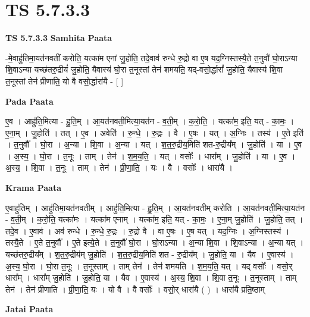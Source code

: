 \documentclass[17pt]{extarticle}
\begin{document}
\section{ TS 5.7.3.3 }

\textbf{TS 5.7.3.3 } \newline
\textbf{Samhita Paata} \newline

-मे॒वाहु॑तिमा॒यत॑नवतीं करोति॒ यत्का॑म एनां जु॒होति॒ तदे॒वाव॑ रुन्धे रु॒द्रो वा ए॒ष यद॒ग्निस्तस्यै॒ते त॒नुवौ॑ घो॒राऽन्या शि॒वाऽन्या यच्छ॑तरु॒द्रीयं॑ जु॒होति॒ यैवास्य॑ घो॒रा त॒नूस्तां तेन॑ शमयति॒ यद्-वसो॒र्द्धारां᳚ जु॒होति॒ यैवास्य॑ शि॒वा त॒नूस्तां तेन॑ प्रीणाति॒ यो वै वसो॒र्द्धारा॑यै - [  ] \newline

\textbf{Pada Paata} \newline

ए॒व । आहु॑ति॒मित्या - हु॒ति॒म् । आ॒यत॑नवती॒मित्या॒यत॑न - व॒ती॒म् । क॒रो॒ति॒ । यत्का॑म॒ इति॒ यत् - का॒मः॒ । ए॒ना॒म् । जु॒होति॑ । तत् । ए॒व । अवेति॑ । रु॒न्धे॒ । रु॒द्रः । वै । ए॒षः । यत् । अ॒ग्निः । तस्य॑ । ए॒ते इति॑ । त॒नुवौ᳚ । घो॒रा । अ॒न्या । शि॒वा । अ॒न्या । यत् । श॒त॒रु॒द्रीय॒मिति॑ शत-रु॒द्रीय᳚म् । जु॒होति॑ । या । ए॒व । अ॒स्य॒ । घो॒रा । त॒नूः । ताम् । तेन॑ । श॒म॒य॒ति॒ । यत् । वसोः᳚ । धारा᳚म् । जु॒होति॑ । या । ए॒व । अ॒स्य॒ । शि॒वा । त॒नूः । ताम् । तेन॑ । प्री॒णा॒ति॒ । यः । वै । वसोः᳚ । धारा॑यै ।  \newline


\textbf{Krama Paata} \newline

ए॒वाहु॑तिम् । आहु॑तिमा॒यत॑नवतीम् । आहु॑ति॒मित्या - हु॒ति॒म् । आ॒यत॑नवतीम् करोति । आ॒यत॑नवती॒मित्या॒यत॑न - व॒ती॒म् । क॒रो॒ति॒ यत्का॑मः । यत्का॑म एनाम् । यत्का॑म॒ इति॒ यत् - का॒मः॒ । ए॒ना॒म् जु॒होति॑ । जु॒होति॒ तत् । तदे॒व । ए॒वाव॑ । अव॑ रुन्धे । रु॒न्धे॒ रु॒द्रः । रु॒द्रो वै । वा ए॒षः । ए॒ष यत् । यद॒ग्निः । अ॒ग्निस्तस्य॑ । तस्यै॒ते । ए॒ते त॒नुवौ᳚ । ए॒ते इत्ये॒ते । त॒नुवौ॑ घो॒रा । घो॒राऽन्या । अ॒न्या शि॒वा । शि॒वाऽन्या । अ॒न्या यत् । यच्छ॑तरु॒द्रीय᳚म् । श॒त॒रु॒द्रीय॑म् जु॒होति॑ । श॒त॒रु॒द्रीय॒मिति॑ शत - रु॒द्रीय᳚म् । जु॒होति॒ या । यैव । ए॒वास्य॑ । अ॒स्य॒ घो॒रा । घो॒रा त॒नूः । त॒नूस्ताम् । ताम् तेन॑ । तेन॑ शमयति । श॒म॒य॒ति॒ यत् । यद् वसोः᳚ । वसो॒र् धारा᳚म् । धारा᳚म् जु॒होति॑ । जु॒होति॒ या । यैव । ए॒वास्य॑ । अ॒स्य॒ शि॒वा । शि॒वा त॒नूः । त॒नूस्ताम् । ताम् तेन॑ । तेन॑ प्रीणाति । प्री॒णा॒ति॒ यः । यो वै । वै वसोः᳚ । वसो॒र् धारा॑यै ( ) । धारा॑यै प्रति॒ष्ठाम् \newline

\textbf{Jatai Paata} \newline
\end{document}
